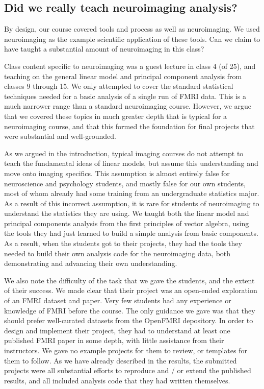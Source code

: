 \subsection{Did we really teach neuroimaging analysis?}

By design, our course covered tools and process as well as neuroimaging.  We
used neuroimaging as the example scientific application of these tools.  Can
we claim to have taught a substantial amount of neuroimaging in this class?

Class content specific to neuroimaging was a guest lecture in class 4 (of 25),
and teaching on the general linear model and principal component analysis from
classes 9 through 15.  We only attempted to cover the standard statistical
techniques needed for a basic analysis of a single run of FMRI data.  This is
a much narrower range than a standard neuroimaging course.  However, we argue
that we covered these topics in much greater depth that is typical for a
neuroimaging course, and that this formed the foundation for final projects
that were substantial and well-grounded.

As we argued in the introduction, typical imaging courses do not attempt to
teach the fundamental ideas of linear models, but assume this understanding
and move onto imaging specifics.  This assumption is almost entirely false for
neuroscience and psychology students, and mostly false for our own
students, most of whom already had some training from an undergraduate
statistics major. As a result of this incorrect assumption, it is rare for
students of neuroimaging to understand the statistics they are using.  We
taught both the linear model and principal components analysis from the first
principles of vector algebra, using the tools they had just learned to build a
simple analysis from basic components.  As a result, when the students got to
their projects, they had the tools they needed to build their own analysis
code for the neuroimaging data, both demonstrating and advancing their own
understanding.

We also note the difficulty of the task that we gave the students, and the
extent of their success.  We made clear that their project was an open-ended
exploration of an FMRI dataset and paper.  Very few students had any
experience or knowledge of FMRI before the course. The only guidance we gave
was that they should prefer well-curated datasets from the OpenFMRI
depository.  In order to design and implement their project, they had to
understand at least one published FMRI paper in some depth, with little
assistance from their instructors.  We gave no example projects for them to
review, or templates for them to follow.  As we have already described in the
results, the submitted projects were all substantial efforts to reproduce and
/ or extend the published results, and all included analysis code that they
had written themselves.

